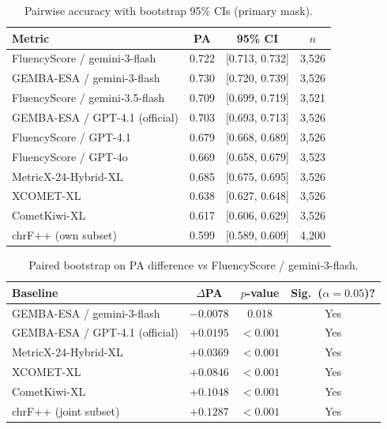 \documentclass[11pt]{article}
\newcommand{\FS}{FluencyScore}
\begin{document}
\begin{table}[t]
\centering
\scriptsize
\caption{Pairwise accuracy with bootstrap 95\% CIs (primary mask).}
\label{tab:1a}
\begin{tabularx}{\columnwidth}{>{\raggedright\arraybackslash}Xccc}
\toprule
Metric & PA & 95\% CI & $n$ \\
\midrule
\FS{} / gemini-3-flash & 0.722 & [0.713, 0.732] & 3,526 \\
GEMBA-ESA / gemini-3-flash & 0.730 & [0.720, 0.739] & 3,526 \\
\FS{} / gemini-3.5-flash & 0.709 & [0.699, 0.719] & 3,521 \\
GEMBA-ESA / GPT-4.1 (official) & 0.703 & [0.693, 0.713] & 3,526 \\
\FS{} / GPT-4.1 & 0.679 & [0.668, 0.689] & 3,526 \\
\FS{} / GPT-4o & 0.669 & [0.658, 0.679] & 3,523 \\
MetricX-24-Hybrid-XL & 0.685 & [0.675, 0.695] & 3,526 \\
XCOMET-XL & 0.638 & [0.627, 0.648] & 3,526 \\
CometKiwi-XL & 0.617 & [0.606, 0.629] & 3,526 \\
chrF++ (own subset) & 0.599 & [0.589, 0.609] & 4,200 \\
\bottomrule
\end{tabularx}

\end{table}

\begin{table}[t]
\centering
\scriptsize
\caption{Paired bootstrap on PA difference vs \FS{} / gemini-3-flash.}
\label{tab:1b}
\begin{tabularx}{\columnwidth}{>{\raggedright\arraybackslash}Xccc}
\toprule
Baseline & $\Delta$PA & $p$-value & Sig.\ ($\alpha{=}0.05$)? \\
\midrule
GEMBA-ESA / gemini-3-flash & $-0.0078$ & 0.018 & Yes \\
GEMBA-ESA / GPT-4.1 (official) & $+0.0195$ & $<0.001$ & Yes \\
MetricX-24-Hybrid-XL & $+0.0369$ & $<0.001$ & Yes \\
XCOMET-XL & $+0.0846$ & $<0.001$ & Yes \\
CometKiwi-XL & $+0.1048$ & $<0.001$ & Yes \\
chrF++ (joint subset) & $+0.1287$ & $<0.001$ & Yes \\
\bottomrule
\end{tabularx}

\end{table}
\end{document}
